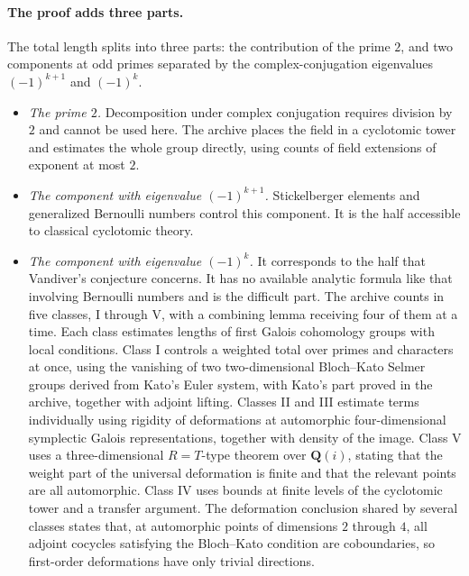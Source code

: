 \documentclass[11pt]{article}
\newcommand{\Q}{\mathbf{Q}}
\begin{document}
\paragraph{The proof adds three parts.} The total length splits into three parts: the contribution of the prime $2$, and two components at odd primes separated by the complex-conjugation eigenvalues $(-1)^{k+1}$ and $(-1)^k$.
\begin{itemize}
\item \emph{The prime $2$.} Decomposition under complex conjugation requires division by $2$ and cannot be used here. The archive places the field in a cyclotomic tower and estimates the whole group directly, using counts of field extensions of exponent at most $2$.
\item \emph{The component with eigenvalue $(-1)^{k+1}$.} Stickelberger elements and generalized Bernoulli numbers control this component. It is the half accessible to classical cyclotomic theory.
\item \emph{The component with eigenvalue $(-1)^k$.} It corresponds to the half that Vandiver's conjecture concerns. It has no available analytic formula like that involving Bernoulli numbers and is the difficult part. The archive counts in five classes, I through V, with a combining lemma receiving four of them at a time. Each class estimates lengths of first Galois cohomology groups with local conditions. Class I controls a weighted total over primes and characters at once, using the vanishing of two two-dimensional Bloch--Kato Selmer groups derived from Kato's Euler system, with Kato's part proved in the archive, together with adjoint lifting. Classes II and III estimate terms individually using rigidity of deformations at automorphic four-dimensional symplectic Galois representations, together with density of the image. Class V uses a three-dimensional $R=T$-type theorem over $\Q(i)$, stating that the weight part of the universal deformation is finite and that the relevant points are all automorphic. Class IV uses bounds at finite levels of the cyclotomic tower and a transfer argument. The deformation conclusion shared by several classes states that, at automorphic points of dimensions $2$ through $4$, all adjoint cocycles satisfying the Bloch--Kato condition are coboundaries, so first-order deformations have only trivial directions.
\end{itemize}
\end{document}
